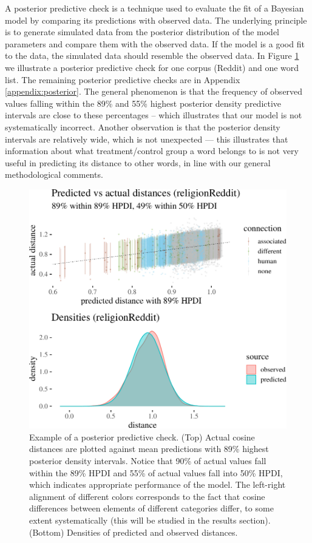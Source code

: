 \documentclass{clv3}
\begin{document}
A posterior predictive check is a technique used to evaluate the fit of
a Bayesian model by comparing its predictions with observed data. The
underlying principle is to generate simulated data from the posterior
distribution of the model parameters and compare them with the observed
data. If the model is a good fit to the data, the simulated data should
resemble the observed data. In Figure \ref{fig:posteriorCheck1} we
illustrate a posterior predictive check for one corpus (Reddit) and one
word list. The remaining posterior predictive checks are in Appendix 
\ref{appendix:posterior}. The general phenomenon is that the frequency of observed values falling within the 89\% and 55\% highest posterior density predictive intervals are close to these percentages -- which illustrates that our model is not systematically incorrect. Another observation is that the posterior density intervals are relatively wide, which is not unexpected --- this illustrates that information about what treatment/control group a word belongs to is not very useful in predicting its distance to other words, in line with our general methodological comments.

\begin{figure}

\begin{center}\includegraphics[width=0.8\linewidth]{figures/figposteriorPrCheckA6b} \end{center}
\caption{Example of a posterior predictive check. (Top) Actual cosine distances are plotted against mean predictions with 89\% highest posterior density intervals. Notice that 90\% of actual values fall within the 89\% HPDI and 55\% of actual values fall into 50\% HPDI, which indicates appropriate performance of the model. The left-right alignment of different colors corresponds to the fact that cosine differences between elements of different categories differ, to some extent systematically (this will be studied in the results section). (Bottom) Densities of predicted and observed distances.}
\label{fig:posteriorCheck1}
\end{figure}
\end{document}
